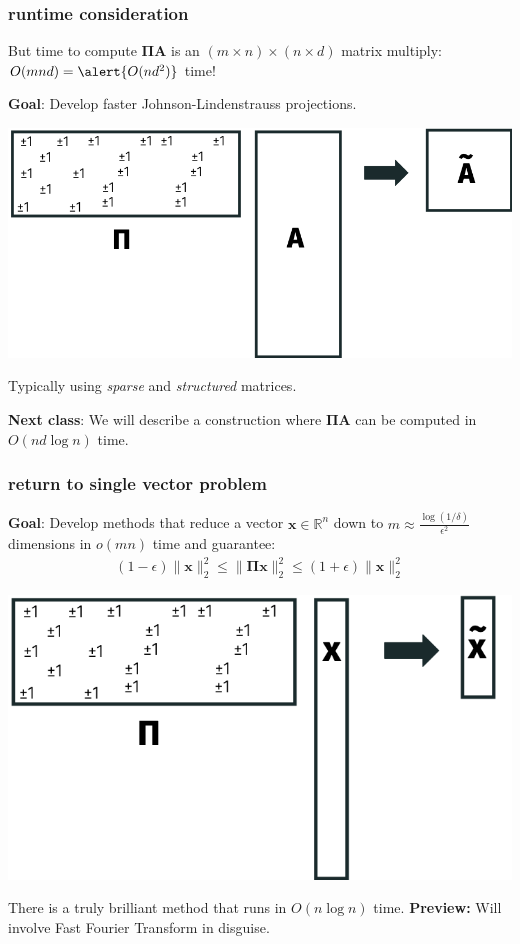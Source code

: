 \documentclass[compress]{beamer}
\newcommand{\bs}[1]{\boldsymbol{#1}}
\newcommand{\bv}[1]{\mathbf{#1}}
\newcommand{\R}{\mathbb{R}}
\begin{document}
\begin{frame}[t]
	\frametitle{runtime consideration}
	But time to compute $\bs{\Pi}\bv{A}$ is an $(m\times n) \times (n \times d)$ matrix multiply: $O(mnd) = \alert{O(nd^2)}$ \alert{time}!
	
	\begin{center}
		\textbf{Goal}: Develop faster Johnson-Lindenstrauss projections.
		\vspace{.5em}
		
		\includegraphics[width=.6\textwidth]{sparseJL.png}
		
		Typically using \emph{sparse} and \emph{structured} matrices.
	
	\end{center}
			\textbf{Next class}: We will describe a construction where $\bs{\Pi}\bv{A}$ can be computed in \alert{$O(nd\log n)$ time}.
\end{frame}

\begin{frame}[t]
	\frametitle{return to single vector problem}
	\textbf{Goal}: Develop methods that reduce a vector $\bv{x}\in \R^n$ down to $m \approx \frac{\log(1/\delta)}{\epsilon^2}$ dimensions in $o(mn)$ time and guarantee:
	\begin{align*}
		(1-\epsilon)\|\bv{x}\|_2^2 \leq \|\bs{\Pi}\bv{x}\|_2^2 \leq (1+\epsilon)\|\bv{x}\|_2^2
	\end{align*}
	\begin{center}
		\includegraphics[width=.6\textwidth]{single_vec.png}
	\end{center}
	There is a truly brilliant method that runs in $O(n\log n)$ time. \textbf{Preview:} Will involve Fast Fourier Transform in disguise. 
\end{frame}
\end{document}
